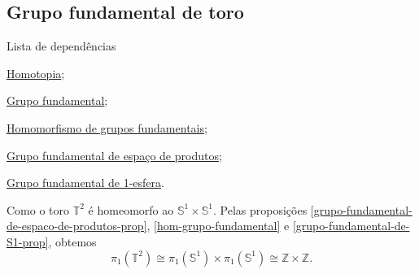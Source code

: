 \subsection{Grupo fundamental de toro}
\label{grupo-fundamental-de-toro-ex}
\begin{titlemize}{Lista de dependências}
    \item \hyperref[homotopia-def]{Homotopia};\\
    \item \hyperref[grupo-fundamental]{Grupo fundamental};\\
    \item \hyperref[hom-grupo-fundamental]{Homomorfismo de grupos fundamentais};\\
    \item \hyperref[grupo-fundamental-de-espaco-de-produtos-prop]{Grupo fundamental de espaço de produtos};\\
    \item \hyperref[grupo-fundamental-de-S1-prop]{Grupo fundamental de 1-esfera}.
    
\end{titlemize}

\begin{ex}
    Como o toro $\mathbb{T}^2$ é homeomorfo ao $\mathbb{S}^1\times\mathbb{S}^1$. Pelas proposições \ref{grupo-fundamental-de-espaco-de-produtos-prop}, \ref{hom-grupo-fundamental} e \ref{grupo-fundamental-de-S1-prop}, obtemos 
    \[\pi_1(\mathbb{T}^2)\cong \pi_1(\mathbb{S}^1)\times\pi_1(\mathbb{S}^1)\cong\mathbb{Z}\times\mathbb{Z}.\]
\end{ex}
